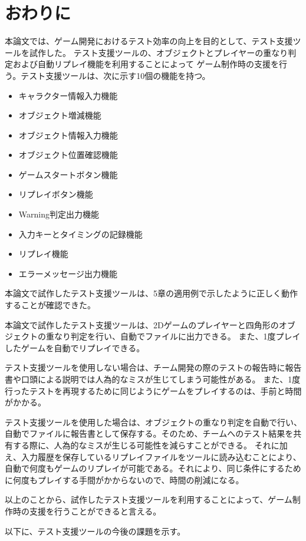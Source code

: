 \chapter{おわりに}\label{cha:Conclusion}
本論文では、ゲーム開発におけるテスト効率の向上を目的として、テスト支援ツールを試作した。
テスト支援ツールの、オブジェクトとプレイヤーの重なり判定および自動リプレイ機能を利用することによって
ゲーム制作時の支援を行う。テスト支援ツールは、次に示す10個の機能を持つ。

\begin{itemize}
	\item キャラクター情報入力機能
	\item オブジェクト増減機能
	\item オブジェクト情報入力機能
	\item オブジェクト位置確認機能
	\item ゲームスタートボタン機能
	\item リプレイボタン機能
	\item Warning判定出力機能
	\item 入力キーとタイミングの記録機能
	\item リプレイ機能
	\item エラーメッセージ出力機能
\end{itemize}

本論文で試作したテスト支援ツールは、5章の適用例で示したように正しく動作することが確認できた。

本論文で試作したテスト支援ツールは、2Dゲームのプレイヤーと四角形のオブジェクトの重なり判定を行い、自動でファイルに出力できる。
また、1度プレイしたゲームを自動でリプレイできる。

テスト支援ツールを使用しない場合は、チーム開発の際のテストの報告時に報告書や口頭による説明では人為的なミスが生じてしまう可能性がある。
また、1度行ったテストを再現するために同じようにゲームをプレイするのは、手前と時間がかかる。

テスト支援ツールを使用した場合は、オブジェクトの重なり判定を自動で行い、自動でファイルに報告書として保存する。そのため、チームへのテスト結果を共有する際に、人為的なミスが生じる可能性を減らすことができる。
それに加え、入力履歴を保存しているリプレイファイルをツールに読み込むことにより、自動で何度もゲームのリプレイが可能である。それにより、同じ条件にするために何度もプレイする手間がかからないので、時間の削減になる。

以上のことから、試作したテスト支援ツールを利用することによって、ゲーム制作時の支援を行うことができると言える。


以下に、テスト支援ツールの今後の課題を示す。

